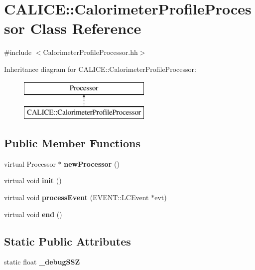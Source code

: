 \section{C\-A\-L\-I\-C\-E\-:\-:Calorimeter\-Profile\-Processor Class Reference}
\label{classCALICE_1_1CalorimeterProfileProcessor}


{\ttfamily \#include $<$Calorimeter\-Profile\-Processor.\-hh$>$}

Inheritance diagram for C\-A\-L\-I\-C\-E\-:\-:Calorimeter\-Profile\-Processor\-:\begin{figure}[H]
\begin{center}
\leavevmode
\includegraphics[height=2.000000cm]{classCALICE_1_1CalorimeterProfileProcessor}
\end{center}
\end{figure}
\subsection*{Public Member Functions}
\begin{DoxyCompactItemize}
\item 
virtual Processor $\ast$ {\bfseries new\-Processor} ()\label{classCALICE_1_1CalorimeterProfileProcessor_a9d924ca43abcbc887cba141381994aa2}

\item 
virtual void {\bfseries init} ()\label{classCALICE_1_1CalorimeterProfileProcessor_a82d456c3810e6142cd4b21fd0778245a}

\item 
virtual void {\bfseries process\-Event} (E\-V\-E\-N\-T\-::\-L\-C\-Event $\ast$evt)\label{classCALICE_1_1CalorimeterProfileProcessor_af622a71001b865c1df94369ee3116b84}

\item 
virtual void {\bfseries end} ()\label{classCALICE_1_1CalorimeterProfileProcessor_a9d5115ea8f88980722c655010eb2f271}

\end{DoxyCompactItemize}
\subsection*{Static Public Attributes}
\begin{DoxyCompactItemize}
\item 
static float {\bfseries \-\_\-debug\-S\-S\-Z}\label{classCALICE_1_1CalorimeterProfileProcessor_a329b77d1f703b4c44f68b7bb51fd919d}

\end{DoxyCompactItemize}

